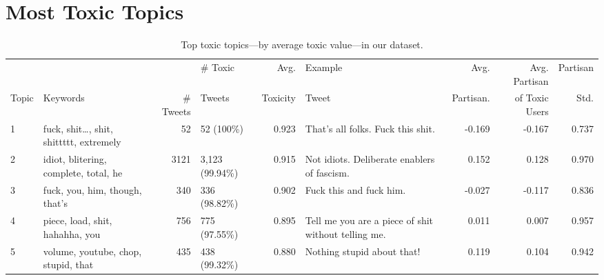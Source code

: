 \section{Most Toxic Topics \label{sec:most-toxic-by-percentage}}
\begin{table}[!h]
\centering
\scriptsize
\selectfont
\setlength{\tabcolsep}{4pt}
\begin{tabularx}{\textwidth}{l|XrXrXrrr}
\toprule
 &   &  &   \# Toxic & Avg.& Example & Avg.  & Avg. Partisan  & Partisan \\
 Topic& {Keywords}&\# Tweets &Tweets  & Toxicity &  Tweet  & Partisan. & of Toxic Users& Std. \\
\midrule

 1 & fuck, shit…, shit, shittttt, extremely &52 & 52 (100\%) &0.923 & That's all folks. Fuck this shit. &-0.169 &-0.167 & 0.737\\ 
2 & idiot, blitering, complete, total, he & 3121 & 3,123 (99.94\%) &0.915 & Not idiots. Deliberate enablers of fascism. &  0.152 & 0.128 & 0.970 \\
3& fuck, you, him, though, that's & 340 & 336 (98.82\%) &0.902& Fuck this and fuck him.& -0.027& -0.117 & 0.836 \\
4& piece, load, shit, hahahha, you &756 & 775 (97.55\%) &0.895 &   Tell me you are a piece of shit without telling me. & 0.011 &0.007& 0.957 \\
5&volume, youtube, chop, stupid, that & 435 & 438 (99.32\%) &0.880 & Nothing stupid about that!  & 0.119&0.104& 0.942 \\


\bottomrule
\end{tabularx}
\caption{\label{tab:narratives} Top toxic topics---by average toxic value---in our dataset.\label{table:toxic-topic-max}} 
\end{table}


\newpage
